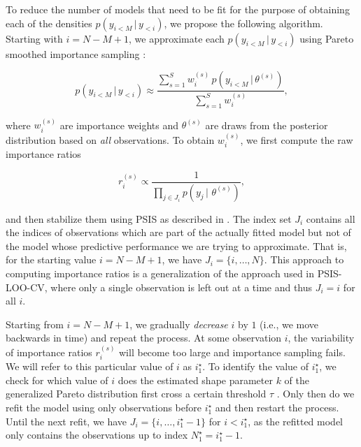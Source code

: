\documentclass[american,]{article}
\begin{document}
To reduce the number of models that need to be fit for the purpose of obtaining
each of the densities \(p(y_{i<M} \,|\, y_{<i})\), we propose the following
algorithm. Starting with \(i = N - M + 1\), we approximate each
\(p(y_{i<M} \,|\, y_{<i})\) using Pareto smoothed importance sampling \citep[PSIS;][]{vehtari2017loo, vehtari2017psis}:

\begin{equation}
 p(y_{i<M} \,|\, y_{<i}) \approx
   \frac{ \sum_{s=1}^S w_i^{(s)}\, p(y_{i<M} \,|\, \theta^{(s)})}{ \sum_{s=1}^S w_i^{(s)}},
\end{equation}

where \(w_i^{(s)}\) are importance weights and \(\theta^{(s)}\) are draws from the
posterior distribution based on \emph{all} observations. To obtain \(w_i^{(s)}\), we
first compute the raw importance ratios

\begin{equation}
r_i^{(s)} \propto \frac{1}{\prod_{j \in J_i} p(y_j \,|\, \,\theta^{(s)})},
\end{equation}

and then stabilize them using PSIS as described in \citet{vehtari2017psis}. The index
set \(J_i\) contains all the indices of observations which are part of the actually
fitted model but not of the model whose predictive performance we are trying to
approximate. That is, for the starting value \(i = N - M + 1\), we have
\(J_i = \{i, \ldots, N\}\). This approach to computing importance ratios is a
generalization of the approach used in PSIS-LOO-CV, where only a single observation
is left out at a time and thus \(J_i = i\) for all \(i\).

Starting from \(i = N - M + 1\), we gradually \emph{decrease} \(i\) by \(1\) (i.e., we move
backwards in time) and repeat the process. At some observation \(i\), the
variability of importance ratios \(r_i^{(s)}\) will become too large and
importance sampling fails. We will refer to this particular value of \(i\) as
\(i^\star_1\). To identify the value of \(i^\star_1\), we check for which value of
\(i\) does the estimated shape parameter \(k\) of the generalized Pareto
distribution first cross a certain threshold \(\tau\) \citep{vehtari2017psis}. Only
then do we refit the model using only observations before \(i^\star_1\) and then
restart the process. Until the next refit, we have \(J_i = \{i, \ldots, i^\star_1 -1 \}\) for \(i < i^\star_1\), as the refitted model only contains the observations
up to index \(N^\star_1 = i^\star_1 - 1\).
\end{document}

